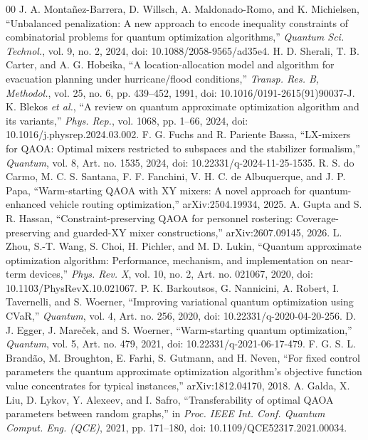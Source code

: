 \documentclass[conference]{IEEEtran}
\begin{document}
\begin{thebibliography}{00}
 J. A. Monta\~{n}ez-Barrera, D. Willsch, A. Maldonado-Romo, and K. Michielsen, ``Unbalanced penalization: A new approach to encode inequality constraints of combinatorial problems for quantum optimization algorithms,'' \textit{Quantum Sci. Technol.}, vol. 9, no. 2, 2024, doi: 10.1088/2058-9565/ad35e4.
 H. D. Sherali, T. B. Carter, and A. G. Hobeika, ``A location-allocation model and algorithm for evacuation planning under hurricane/flood conditions,'' \textit{Transp. Res. B, Methodol.}, vol. 25, no. 6, pp. 439--452, 1991, doi: 10.1016/0191-2615(91)90037-J.
 K. Blekos \textit{et al.}, ``A review on quantum approximate optimization algorithm and its variants,'' \textit{Phys. Rep.}, vol. 1068, pp. 1--66, 2024, doi: 10.1016/j.physrep.2024.03.002.
 F. G. Fuchs and R. Pariente Bassa, ``LX-mixers for QAOA: Optimal mixers restricted to subspaces and the stabilizer formalism,'' \textit{Quantum}, vol. 8, Art. no. 1535, 2024, doi: 10.22331/q-2024-11-25-1535.
 R. S. do Carmo, M. C. S. Santana, F. F. Fanchini, V. H. C. de Albuquerque, and J. P. Papa, ``Warm-starting QAOA with XY mixers: A novel approach for quantum-enhanced vehicle routing optimization,'' arXiv:2504.19934, 2025.
 A. Gupta and S. R. Hassan, ``Constraint-preserving QAOA for personnel rostering: Coverage-preserving and guarded-XY mixer constructions,'' arXiv:2607.09145, 2026.
 L. Zhou, S.-T. Wang, S. Choi, H. Pichler, and M. D. Lukin, ``Quantum approximate optimization algorithm: Performance, mechanism, and implementation on near-term devices,'' \textit{Phys. Rev. X}, vol. 10, no. 2, Art. no. 021067, 2020, doi: 10.1103/PhysRevX.10.021067.
 P. K. Barkoutsos, G. Nannicini, A. Robert, I. Tavernelli, and S. Woerner, ``Improving variational quantum optimization using CVaR,'' \textit{Quantum}, vol. 4, Art. no. 256, 2020, doi: 10.22331/q-2020-04-20-256.
 D. J. Egger, J. Mare\v{c}ek, and S. Woerner, ``Warm-starting quantum optimization,'' \textit{Quantum}, vol. 5, Art. no. 479, 2021, doi: 10.22331/q-2021-06-17-479.
 F. G. S. L. Brand\~{a}o, M. Broughton, E. Farhi, S. Gutmann, and H. Neven, ``For fixed control parameters the quantum approximate optimization algorithm's objective function value concentrates for typical instances,'' arXiv:1812.04170, 2018.
 A. Galda, X. Liu, D. Lykov, Y. Alexeev, and I. Safro, ``Transferability of optimal QAOA parameters between random graphs,'' in \textit{Proc. IEEE Int. Conf. Quantum Comput. Eng. (QCE)}, 2021, pp. 171--180, doi: 10.1109/QCE52317.2021.00034.

\end{thebibliography}
\end{document}
